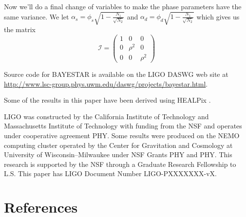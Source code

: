 \documentclass{iopart}
\begin{document}
Now we'll do a final change of variables to make the phase parameters have the same variance. We let $\alpha_s = \phi_s \sqrt{1 - \frac{N_1}{\sqrt{N_2}}}$ and $\alpha_d = \phi_d \sqrt{1 - \frac{N_1}{\sqrt{N_2}}}$ which gives us the matrix
\[
\mathcal{I} =
\left( {\begin{array}{ccc}
 1 & 0 & 0 \\
 0 & \rho^2 & 0 \\
 0 & 0 & \rho^2
 \end{array} } \right)
\]



\ack Source code for \ac{BAYESTAR} is available on the \acs{LIGO} \acl{DASWG} web site at \url{http://www.lsc-group.phys.uwm.edu/daswg/projects/bayestar.html}.

Some of the results in this paper have been derived using HEALPix \cite{healpix}.

\acs{LIGO} was constructed by the California Institute of Technology and Massachusetts Institute of Technology with funding from the \ac{NSF} and operates under cooperative agreement PHY. Some results were produced on the NEMO computing cluster operated by the Center for Gravitation and Cosmology at University of Wisconsin\nobreakdashes--Milwaukee under \ac{NSF} Grants PHY and PHY. This research is supported by the \ac{NSF} through a Graduate Research Fellowship to L.S. This paper has \acs{LIGO} Document Number \acs{LIGO}\nobreakdashes-PXXXXXXX\nobreakdashes-vX.


\section*{References}


\end{document}
